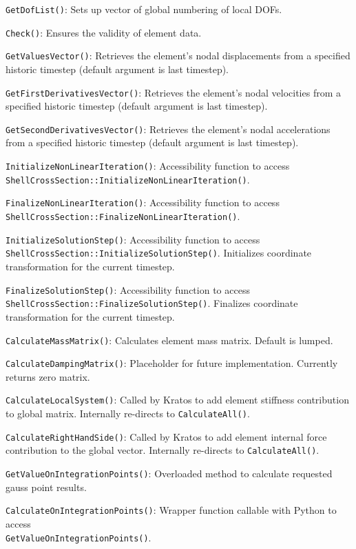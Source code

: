 \texttt{GetDofList()}: Sets up vector of global numbering of local DOFs.

\texttt{Check()}: Ensures the validity of element data.

\texttt{GetValuesVector()}: Retrieves the element's nodal displacements from a specified historic timestep (default argument is last timestep).

\texttt{GetFirstDerivativesVector()}: Retrieves the element's nodal velocities from a specified historic timestep (default argument is last timestep).

\texttt{GetSecondDerivativesVector()}: Retrieves the element's nodal accelerations from a specified historic timestep (default argument is last timestep).

\texttt{InitializeNonLinearIteration()}: Accessibility function to access \\ \texttt{ShellCrossSection::InitializeNonLinearIteration()}.

\texttt{FinalizeNonLinearIteration()}: Accessibility function to access \\ \texttt{ShellCrossSection::FinalizeNonLinearIteration()}.

\texttt{InitializeSolutionStep()}: Accessibility function to access \\ \texttt{ShellCrossSection::InitializeSolutionStep()}. Initializes coordinate transformation for the current timestep.

\texttt{FinalizeSolutionStep()}: Accessibility function to access \\ \texttt{ShellCrossSection::FinalizeSolutionStep()}. Finalizes coordinate transformation for the current timestep.

\texttt{CalculateMassMatrix()}: Calculates element mass matrix. Default is lumped.

\texttt{CalculateDampingMatrix()}: Placeholder for future implementation. Currently returns zero matrix.

\texttt{CalculateLocalSystem()}: Called by Kratos to add element stiffness contribution to global matrix. Internally re-directs to \texttt{CalculateAll()}.

\texttt{CalculateRightHandSide()}: Called by Kratos to add element internal force contribution to the global vector. Internally re-directs to \texttt{CalculateAll()}.

\texttt{GetValueOnIntegrationPoints()}: Overloaded method to calculate requested gauss point results.

\texttt{CalculateOnIntegrationPoints()}: Wrapper function callable with Python to access \\ \texttt{GetValueOnIntegrationPoints()}.

